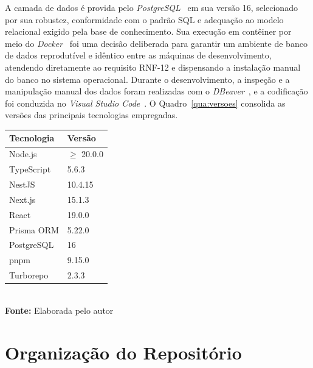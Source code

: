 A camada de dados é provida pelo \textit{PostgreSQL}~\cite{PostgreSQL} em sua versão 16, selecionado por sua robustez, conformidade com o padrão SQL e adequação ao modelo relacional exigido pela base de conhecimento. Sua execução em contêiner por meio do \textit{Docker}~\cite{Docker} foi uma decisão deliberada para garantir um ambiente de banco de dados reprodutível e idêntico entre as máquinas de desenvolvimento, atendendo diretamente ao requisito RNF-12 e dispensando a instalação manual do banco no sistema operacional. Durante o desenvolvimento, a inspeção e a manipulação manual dos dados foram realizadas com o \textit{DBeaver}~\cite{DBeaver}, e a codificação foi conduzida no \textit{Visual Studio Code}~\cite{VSCode}. O Quadro~\ref{qua:versoes} consolida as versões das principais tecnologias empregadas.

\FloatBarrier
\begin{quadro}[!htbp]
  \centering
  \caption{Versões das principais tecnologias utilizadas}
  \begin{tabular}{l l}
    \hline
    \textbf{Tecnologia} & \textbf{Versão} \\ \hline
    Node.js             & $\geq$ 20.0.0   \\ \hline
    TypeScript          & 5.6.3           \\ \hline
    NestJS              & 10.4.15         \\ \hline
    Next.js             & 15.1.3          \\ \hline
    React               & 19.0.0          \\ \hline
    Prisma ORM          & 5.22.0          \\ \hline
    PostgreSQL          & 16              \\ \hline
    pnpm                & 9.15.0          \\ \hline
    Turborepo           & 2.3.3           \\ \hline
  \end{tabular}
  \\ \vspace{0.2cm}
  \textbf{Fonte:} Elaborada pelo autor
  \label{qua:versoes}
\end{quadro}
\FloatBarrier

\section{Organização do Repositório}
\label{sec:monorepo}

